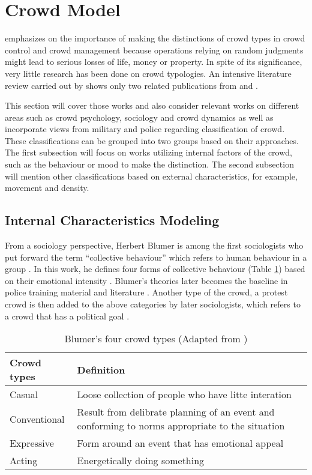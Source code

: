 \section{Crowd Model}

\citet{Berlonghi1995} emphasizes on the importance of making the distinctions of crowd types in crowd control and crowd management because operations relying on random judgments might lead to serious losses of life, money or property. In spite of its significance, very little research has been done on crowd typologies. An intensive literature review carried out by \citet{Challenger2009} shows only two related publications from \citet{Momboisse1967} and \citet{Berlonghi1995}.

This section will cover those works and also consider relevant works on different areas such as crowd psychology, sociology and crowd dynamics as well as incorporate views from military and police regarding classification of crowd. These classifications can be grouped into two groups based on their approaches. The first subsection will focus on works utilizing internal factors of the crowd, such as the behaviour or mood to make the distinction. The second subsection will mention other classifications based on external characteristics, for example, movement and density.

\subsection{Internal Characteristics Modeling}

From a sociology perspective, Herbert Blumer is among the first sociologists who put forward the term ``collective behaviour'' which refers to human behaviour in a group \citep{Blumer1951}. In this work, he defines four forms of collective behaviour (Table \ref{table:blumerCrowdType}) based on their emotional intensity \citep{Imhonopi2013}. Blumer’s theories later becomes the baseline in police training material and literature \citep{Schweingruber2000}. Another type of the crowd, a protest crowd is then added to the above categories by later sociologists, which refers to a crowd that has a political goal \citep{Imhonopi2013}.

\begin{table}
	\caption{Blumer's four crowd types (Adapted from \citet{Imhonopi2013})}
	\label{table:blumerCrowdType}
	\centering
	\begin{tabular}{|l|p{10cm}|}
	\hline
	\textbf{Crowd types} & \textbf{Definition} \\
	\hline
	Casual & Loose collection of people who have litte interation \\
	Conventional & Result from delibrate planning of an event and conforming to norms appropriate to the situation \\
	Expressive & Form around an event that has emotional appeal \\
	Acting & Energetically doing something \\
	\hline
	\end{tabular}
\end{table}

